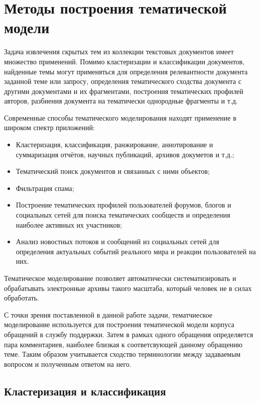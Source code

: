 \section{Методы построения тематической модели}
\label{sec:tm_techniques}

Задача извлечения скрытых тем из коллекции текстовых документов имеет множество применений. Помимо кластеризации и классификации документов, найденные темы могут применяться для определения релевантности документа заданной теме или запросу, определения тематического сходства документа с другими документами и их фрагментами, построения тематических профилей авторов, разбиения документа на тематически однородные фрагменты и т.д. 

Современные способы тематического моделирования находят применение в широком спектр приложений: 

\begin{itemize}
\item Кластеризация, классификация, ранжирование, аннотирование и суммаризация отчётов, научных публикаций, архивов докуметов и т.д.; 
\item Тематический поиск документов и связанных с ними объектов;
\item Фильтрация спама; 
\item Построение тематических профилей пользователей форумов, блогов и социальных сетей для поиска тематических сообществ и определения наиболее активных их участников; 
\item Анализ новостных потоков и сообщений из социальных сетей для определения актуальных событий реального мира и реакции пользователей на них.
\end{itemize}

Тематическое моделирование позволяет автоматически систематизировать и обрабатывать электронные архивы такого масштаба, который человек не в силах обработать.

С точки зрения поставленной в данной работе задачи, тематчиеское моделирование используется для построения тематической модели корпуса обращений в службу поддержки. Затем в рамках одного обращения определяется пара комментариев, наиболее близкая к соответсвующей данному обращению теме. Таким образом учитывается сходство терминологии между задаваемым вопросом и полученным ответом на него.

\subsection{Кластеризация и классификация}

